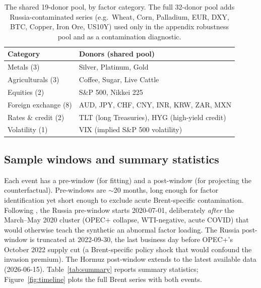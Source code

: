 \documentclass[11pt,a4paper]{article}
\begin{document}
\begin{table}[h]
\centering
\caption{The shared 19-donor pool, by factor category. The full 32-donor pool adds
Russia-contaminated series (e.g.\ Wheat, Corn, Palladium, EUR, DXY, BTC, Copper, Iron
Ore, US10Y) used only in the appendix robustness pool and as a contamination diagnostic.}
\label{tab:donors}
\small
\begin{tabular}{@{}lp{10.5cm}@{}}
\toprule
Category & Donors (shared pool) \\
\midrule
Metals (3) & Silver, Platinum, Gold \\
Agriculturals (3) & Coffee, Sugar, Live Cattle \\
Equities (2) & S\&P 500, Nikkei 225 \\
Foreign exchange (8) & AUD, JPY, CHF, CNY, INR, KRW, ZAR, MXN \\
Rates \& credit (2) & TLT (long Treasuries), HYG (high-yield credit) \\
Volatility (1) & VIX (implied S\&P 500 volatility) \\
\bottomrule
\end{tabular}
\end{table}

\subsection{Sample windows and summary statistics}
Each event has a pre-window (for fitting) and a post-window (for projecting the
counterfactual). Pre-windows are $\sim$20 months, long enough for factor
identification yet short enough to exclude acute Brent-specific contamination.
Following \citet{abadie2021}, the Russia pre-window starts 2020-07-01, deliberately
\emph{after} the March--May 2020 cluster (OPEC+ collapse, WTI-negative, acute COVID)
that would otherwise teach the synthetic an abnormal factor loading. The Russia
post-window is truncated at 2022-09-30, the last business day before OPEC+'s October
2022 supply cut (a Brent-specific policy shock that would confound the invasion
premium). The Hormuz post-window extends to the latest available data (2026-06-15).
Table~\ref{tab:summary} reports summary statistics; Figure~\ref{fig:timeline} plots the
full Brent series with both events.
\end{document}
